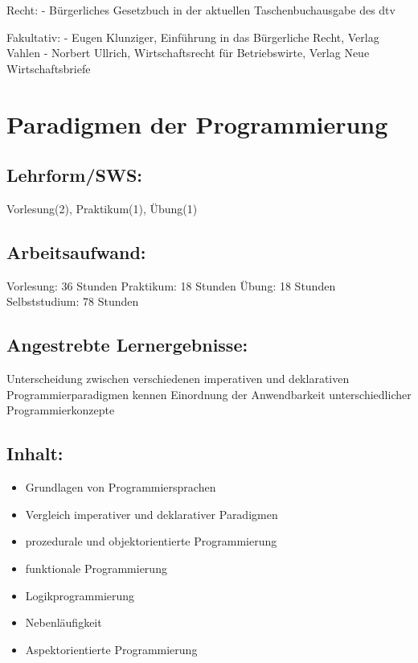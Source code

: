 Recht: - Bürgerliches Gesetzbuch in der aktuellen Taschenbuchausgabe des
dtv

Fakultativ: - Eugen Klunziger, Einführung in das Bürgerliche Recht,
Verlag Vahlen - Norbert Ullrich, Wirtschaftsrecht für Betriebswirte,
Verlag Neue Wirtschaftsbriefe

\chapter{Paradigmen der
Programmierung}\label{paradigmen-der-programmierung}

\section{Lehrform/SWS:}\label{lehrformsws-16}

Vorlesung(2), Praktikum(1), Übung(1)

\section{Arbeitsaufwand:}\label{arbeitsaufwand-16}

Vorlesung: 36 Stunden Praktikum: 18 Stunden Übung: 18 Stunden
Selbststudium: 78 Stunden

\section{Angestrebte
Lernergebnisse:}\label{angestrebte-lernergebnisse-17}

Unterscheidung zwischen verschiedenen imperativen und deklarativen
Programmierparadigmen kennen Einordnung der Anwendbarkeit
unterschiedlicher Programmierkonzepte

\section{Inhalt:}\label{inhalt-17}

\begin{itemize}
\tightlist
\item
  Grundlagen von Programmiersprachen
\item
  Vergleich imperativer und deklarativer Paradigmen
\item
  prozedurale und objektorientierte Programmierung
\item
  funktionale Programmierung
\item
  Logikprogrammierung
\item
  Nebenläufigkeit
\item
  Aspektorientierte Programmierung
\end{itemize}

